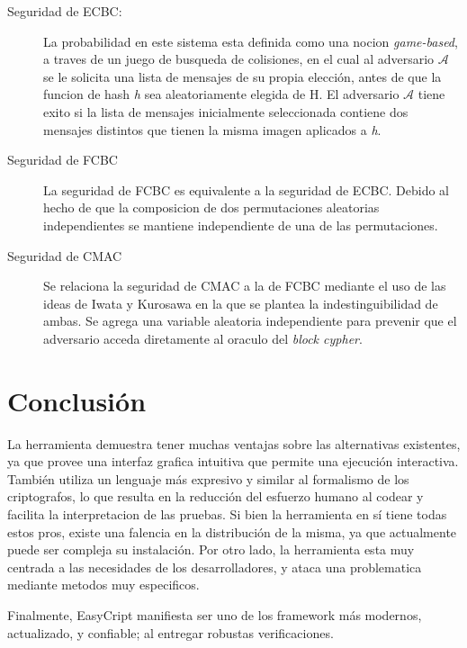 \documentclass[runningheads]{llncs}
\begin{document}
\begin{description}
\item[Seguridad de ECBC:] La probabilidad en este sistema esta definida como una nocion \textit{game-based}, a traves de un juego de busqueda de colisiones, en el cual al adversario $\mathcal{A}$ se le solicita una lista de mensajes de su propia elección, antes de que la funcion de hash \textit{h} sea aleatoriamente elegida de H. El adversario $\mathcal{A}$ tiene exito si la lista de mensajes inicialmente seleccionada contiene dos mensajes distintos que tienen la misma imagen aplicados a \textit{h}.

\item[Seguridad de FCBC] La seguridad de FCBC es equivalente a la seguridad de ECBC. Debido al hecho de que la composicion de dos permutaciones aleatorias independientes se mantiene independiente de una de las permutaciones.

\item[Seguridad de CMAC] Se relaciona la seguridad de CMAC a la de FCBC mediante el uso de las ideas de Iwata y Kurosawa en la que se plantea la indestinguibilidad de ambas. Se agrega una variable aleatoria independiente para prevenir que el adversario acceda diretamente al oraculo del \textit{block cypher}.
\end{description}

\section{Conclusión}

La herramienta demuestra tener muchas ventajas sobre las alternativas existentes, ya que provee una interfaz grafica intuitiva que permite una ejecución interactiva. También utiliza un lenguaje más expresivo y similar al formalismo de los criptografos, lo que resulta en la reducción del esfuerzo humano al codear y facilita la interpretacion de las pruebas. Si bien la herramienta en sí tiene todas estos pros, existe una falencia en la distribución de la misma, ya que actualmente puede ser compleja su instalación. Por otro lado, la herramienta esta muy centrada a las necesidades de los desarrolladores, y ataca una problematica mediante metodos muy especificos.

Finalmente, EasyCript manifiesta ser uno de los framework más modernos, actualizado, y confiable; al entregar robustas verificaciones.



\end{document}
